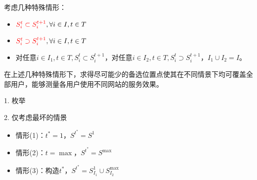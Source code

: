 \documentclass[10pt]{beamer}
\begin{document}
\begin{frame}
考虑几种特殊情形：
\begin{itemize}
  \item  ${\color{red}S_i^t \subset S_i^{t+1}},\forall i\in I,t\in T$
  \item ${\color{red}S_i^t \supset S_i^{t+1}},\forall i\in I,t\in T$
  \item {\color{red}对任意$i\in I_1,t\in T,S_i^t \subset S_i^{t+1}$，对任意$i\in I_2,t\in T,S_i^t \supset S_i^{t+1}$，$I_1\cup I_2=I$}。
\end{itemize}
在上述几种特殊情形下，求得尽可能少的备选位置点使其在不同情景下均可覆盖全部用户，能够测量各用户使用不同网站的服务效果。
\end{frame}
 \begin{frame}
 1. 枚举

2. 仅考虑最坏的情景
\begin{itemize}
  \item  情形(1)：$t^*=1$，$S^{t^*}=S^1$
  \item 情形(2)：$t=\max$，$S^{t^*}=S^{\max}$
  \item 情形(3)：构造$t^*$，$S^{t^*}=S^1_{I_1}\cup S_{I_2}^{\max}$
\end{itemize}
\end{frame}
\end{document}
